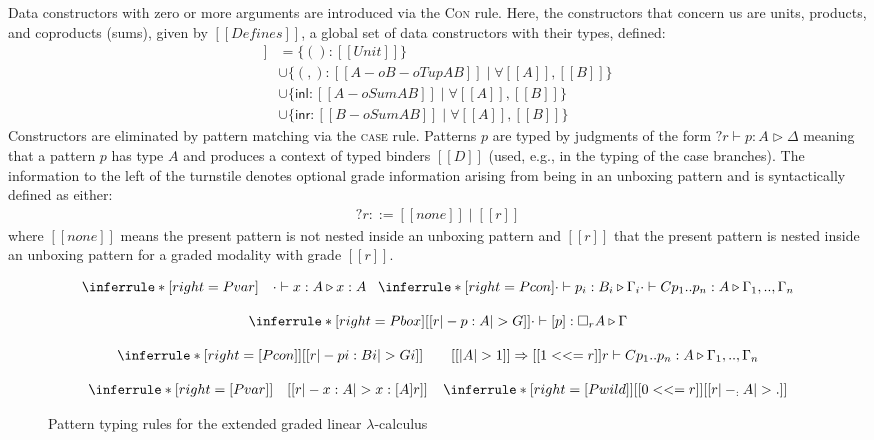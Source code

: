 Data constructors with zero or more arguments are introduced via
the \textsc{Con} rule. Here, the constructors that concern us are
units, products, and coproducts (sums), given by $[[ Defines ]]$,
a global set of data constructors with their types, defined:
%
\begin{align*}
[[ Defines ]] & = \{() : [[ Unit ]]\}\\
& \cup \{(,) : [[ A -o {B -o Tup A B} ]] \mid \forall [[ A ]], [[ B ]] \} \\ 
& \cup \{\mathsf{inl} : [[ A -o Sum A B ]] \mid \forall [[ A ]], [[ B ]] \} \\
& \cup \{\mathsf{inr} : [[ B -o Sum A B ]] \mid \forall [[ A ]], [[ B ]] \}
\end{align*}
%
Constructors are eliminated by pattern matching via the \textsc{case} rule.
Patterns $p$ are typed by judgments of the form $?r \vdash p : A \triangleright
\Delta$ meaning that a pattern $p$ has type $A$ and produces a context of typed
binders $[[ D ]]$ (used, e.g., in the typing of the case branches). The
information to the left of the turnstile denotes optional grade information
arising from being in an unboxing pattern and is syntactically defined as
either:
%
\begin{align*}
?r ::= [[ none ]] \mid [[ r ]]
\tag{enclosing grade}
\end{align*}
%
 where $[[ none ]]$ means the present pattern is not nested inside an
unboxing pattern and $[[ r ]]$ that the present pattern is nested
inside an unboxing pattern for a graded modality with grade $[[r]]$.

\begin{figure}[t]
\begin{align*}
\setlength{\arraycolsep}{0em}
\begin{array}{ccc}
\inferrule*[right=Pvar]
 {\quad}
 {\cdot \vdash x : A \triangleright x : A}
\;\;\;
\inferrule*[right=Pcon]
{\cdot \vdash p_i : B_i \triangleright \Gamma_i}
{\cdot \vdash C p_1 .. p_n : A \triangleright \Gamma_1, .., \Gamma_n}
\\[1.25em]
\inferrule*[right={Pbox}]
{[[ r |- p : A |> G ]]}
{\cdot \vdash [p] : \Box_r A \triangleright \Gamma }
 \\[1.25em]
\inferrule*[right={[}Pcon{]}]
{[[ r |- pi : Bi |> Gi ]] \quad\quad
[[ |A| > 1 ]] \Rightarrow [[ 1 <<= r ]]}
{r \vdash C p_1 .. p_n : A \triangleright \Gamma_1, .., \Gamma_n}
%
\\[1.25em]
\inferrule*[right={[}Pvar{]}]
 {\quad}
 {[[ r |- x : A |> x : [ A ] { r } ]]}
 \;\;\;\;
\inferrule*[right={[}Pwild{]}]
 {[[ 0 <<= r ]]}
 {[[ r |- _ : A |> . ]]}
\end{array}
\end{align*}
\caption{Pattern typing rules for the extended graded linear $\lambda$-calculus}
\label{fig:deriving-pattern-rules}
\end{figure}

